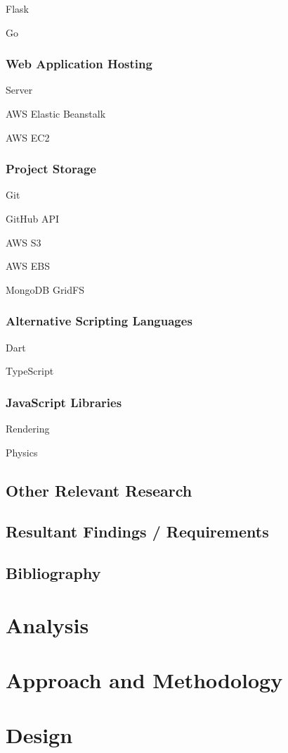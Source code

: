 \documentclass[a4paper, 12pt]{article}
\begin{document}
Flask

Go


\subsubsection{Web Application Hosting}
Server


AWS Elastic Beanstalk


AWS EC2


\subsubsection{Project Storage}
Git


GitHub API


AWS S3


AWS EBS


MongoDB GridFS


\subsubsection{Alternative Scripting Languages}
Dart


TypeScript


\subsubsection{JavaScript Libraries}
Rendering


Physics





\subsection{Other Relevant Research}
\subsection{Resultant Findings / Requirements}
\subsection{Bibliography}
\section{Analysis}
\section{Approach and Methodology}
\section{Design}
\end{document}

